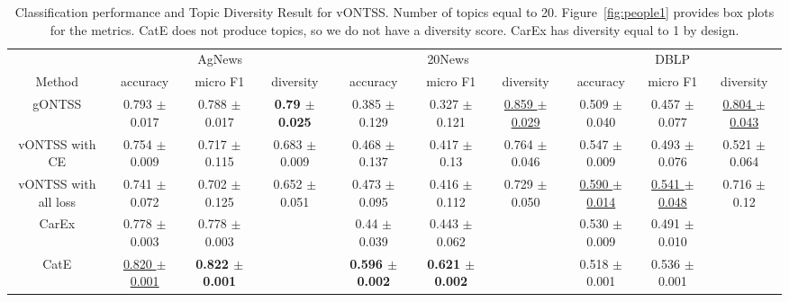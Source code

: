 \documentclass[11pt]{article}
\begin{document}
\begin{table*}
\centering

\caption{\label{tab:people1}Classification performance and Topic Diversity Result for vONTSS. Number of topics equal to 20. Figure~\ref{fig:people1} provides box plots for the metrics. CatE does not produce topics, so we do not have a diversity score. CarEx has diversity equal to 1 by design.}
\vskip 0.15in
\scalebox{0.63} {
\centering
\begin{tabular}{| c| c c c| c c c| c c c |} 
\hline
\multicolumn{1}{c}{} \vline &
\multicolumn{3}{c}{AgNews}\vline  & \multicolumn{3}{c}{20News} \vline & \multicolumn{3}{c}{DBLP}\vline\\
\multicolumn{1}{c}{Method} \vline &
\multicolumn{1}{c}{accuracy} & \multicolumn{1}{c}{micro F1} & \multicolumn{1}{c}{diversity} \vline
& \multicolumn{1}{c}{accuracy} & \multicolumn{1}{c}{micro F1} & \multicolumn{1}{c}{diversity} \vline
& \multicolumn{1}{c}{accuracy} & \multicolumn{1}{c}{micro F1} & \multicolumn{1}{c}{diversity} \vline\\
\hline
\multicolumn{1}{c}{gONTSS} \vline & 0.793 $\pm$ 0.017 & 0.788 $\pm$ 0.017 & \textbf{0.79 $\pm$ 0.025}  & 0.385 $\pm$ 0.129 & 0.327 $\pm$ 0.121 & \underline{0.859 $\pm$ 0.029} & 0.509 $\pm$ 0.040 & 0.457 $\pm$ 0.077 & \underline{0.804 $\pm$ 0.043} \\



\multicolumn{1}{c}{vONTSS with CE} \vline  & 0.754 $\pm$ 0.009 & 0.717 $\pm$ 0.115 & 0.683 $\pm$ 0.009 &  0.468 $\pm$ 0.137 & 0.417 $\pm$ 0.13  & 0.764 $\pm$ 0.046 &  0.547 $\pm$ 0.009 & 0.493 $\pm$ 0.076 & 0.521 $\pm$ 0.064 \\



\multicolumn{1}{c}{vONTSS with all loss} \vline & 0.741 $\pm$ 0.072 & 0.702 $\pm$ 0.125 & 0.652 $\pm$ 0.051 & 0.473 $\pm$ 0.095 & 0.416 $\pm$ 0.112 & 0.729 $\pm$ 0.050 & \underline{0.590 $\pm$ 0.014} & \underline{0.541 $\pm$ 0.048}  & 0.716 $\pm$ 0.12 \\


\multicolumn{1}{c}{CarEx} \vline & 0.778 $\pm$ 0.003 & 0.778 $\pm$ 0.003 &     & 0.44 $\pm$ 0.039  & 0.443 $\pm$ 0.062 &        & 0.530 $\pm$ 0.009 & 0.491 $\pm$ 0.010 &        \\




\multicolumn{1}{c}{CatE} \vline & \underline{0.820 $\pm$ 0.001} & \textbf{0.822 $\pm$ 0.001} &  & \textbf{0.596 $\pm$ 0.002} & \textbf{0.621 $\pm$ 0.002} & &  0.518 $\pm$ 0.001 & 0.536 $\pm$ 0.001 &               \\



\end{tabular}}
\end{table*}
\end{document}
